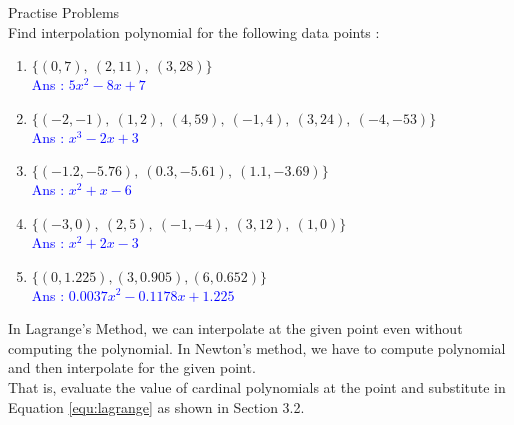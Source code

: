 \begin{remark}
	Practise Problems\\
	Find interpolation polynomial for the following data points :
	\begin{enumerate}
		\item $\{(0,7),\ (2,11),\ (3,28)\}$\\ \textcolor{blue}{Ans : $5x^2-8x+7$} \\ \cite[Example 3.1]{kiusalaas}
		\item $\{(-2,-1),\ (1,2),\ (4,59),\ (-1,4),\ (3,24),\ (-4,-53) \}$\\ \textcolor{blue}{Ans : $x^3-2x+3$}\\ \cite[Example 3.2]{kiusalaas}
		\item $\{(-1.2,-5.76),\ (0.3,-5.61),\ (1.1,-3.69)\}$\\ \textcolor{blue}{Ans : $x^2+x-6$}\\ \cite[Problem Set 3.1.1]{kiusalaas}
		\item $\{(-3,0),\ (2,5),\ (-1,-4),\ (3,12),\ (1,0)\}$\\ \textcolor{blue}{Ans : $x^2+2x-3$}\\ \cite[Problem Set 3.1.7]{kiusalaas}
		\item $\{(0,1.225),(3,0.905),(6,0.652)\}$\\ \textcolor{blue}{Ans : $0.0037x^2-0.1178x+1.225$}\\ \cite[Problem Set 3.1.9]{kiusalaas}
	\end{enumerate}
\end{remark}

\begin{remark}
	In Lagrange's Method, we can interpolate at the given point even without computing the polynomial.
	In Newton's method, we have to compute polynomial and then interpolate for the given point.\\


	That is, evaluate the value of cardinal polynomials at the point and substitute in Equation \ref{equ:lagrange} as shown in Section 3.2.
	\cite[Example 3.1]{kiusalaas}
\end{remark}

